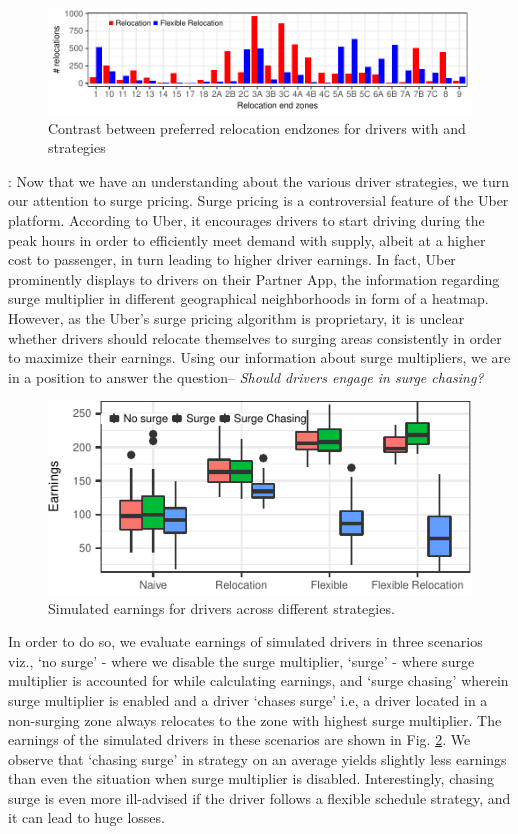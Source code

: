 \begin{figure}
	\centering
	\includegraphics{figures/relocation_endzones.pdf}
	\caption{Contrast between preferred relocation endzones for drivers with 
	{\relocation} and {\relocationflexible} strategies}
	\label{fig:relocation_endzones}
\end{figure}

:
Now that we have an understanding about the various driver strategies, we turn our attention to surge pricing. Surge pricing is a controversial feature of the Uber platform. According to Uber, it encourages drivers to start driving during the peak hours in order to efficiently meet demand with supply, albeit at a higher cost to passenger, in turn leading to higher driver earnings. In fact, Uber prominently displays to drivers on their Partner App, the information regarding surge multiplier in different geographical neighborhoods in form of a heatmap. However, as the Uber's surge pricing algorithm is proprietary, it is unclear whether drivers should relocate themselves to surging areas consistently in order to maximize their earnings. Using our information about surge multipliers, we are in a position to answer the question-- \textit{Should drivers engage in surge chasing?}
\begin{figure}[H]
	\centering
	\caption{Simulated earnings for drivers across different strategies.}
	\label{fig:simulated_earnings}
	\includegraphics{figures/simulated_earnings.pdf}
\end{figure}
In order to do so, we evaluate earnings of simulated drivers in three scenarios viz., `no surge' - where we disable the surge multiplier, `surge' - where surge multiplier is accounted for while calculating earnings, and `surge chasing' wherein surge multiplier is enabled and a driver `chases surge' i.e, a driver located in a non-surging zone always relocates to the zone with highest surge multiplier. The earnings of the simulated drivers in these scenarios are shown in Fig. {\ref{fig:simulated_earnings}}. We observe that `chasing surge' in {\naive} strategy on an average yields slightly less earnings than even the situation when surge multiplier is disabled. Interestingly, chasing surge is even more ill-advised if the driver follows a flexible schedule strategy, and it can lead to huge losses.

